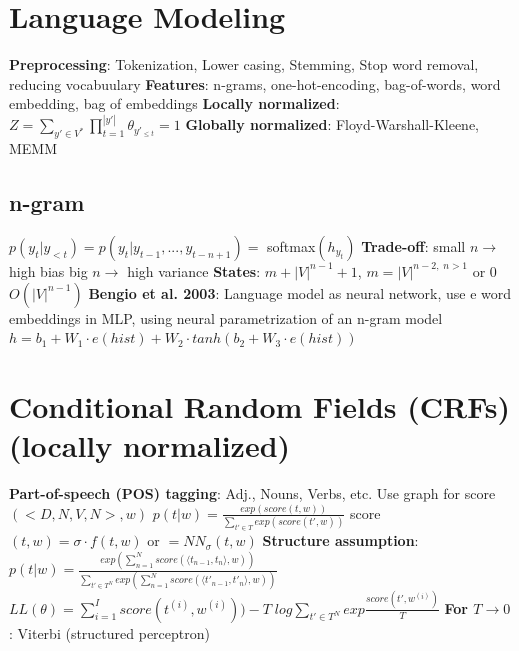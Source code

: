 \documentclass[a4paper, 11pt, landscape]{article}
\begin{document}
\begin{multicols*}{3}
\section{Language Modeling}
\textbf{Preprocessing}: Tokenization, Lower casing, Stemming, Stop word removal, reducing vocabuulary\newline
\textbf{Features}: n-grams, one-hot-encoding, bag-of-words, word embedding, bag of embeddings\newline
\textbf{Locally normalized}: $Z=\sum_{y'\in V^*}\prod_{t=1}^{|y'|}{\theta_{y'_{\le t}}=1}$\newline
\textbf{Globally normalized}: Floyd-Warshall-Kleene, MEMM

\subsection{n-gram}
$p(y_t|y_{<t})=p(y_t|y_{t-1},...,y_{t-n+1})=$ softmax$(h_{y_t})$\newline
\textbf{Trade-off}: small $n \rightarrow$ high bias\qquad
big $n \rightarrow$ high variance\newline
\textbf{States}: $m+|V|^{n-1}+1$, $m=|V|^{n-2,\;n>1}$ or $0$\qquad $O(|V|^{n-1})$\newline
\textbf{Bengio et al. 2003}: Language model as neural network, use e word embeddings in MLP, using neural parametrization of an n-gram model\newline
$h=b_1+W_1\cdot e(hist)+W_2\cdot tanh(b_2+W_3\cdot e(hist))$

\section{Conditional Random Fields (CRFs) (locally normalized)}
\textbf{Part-of-speech (POS) tagging}: Adj., Nouns, Verbs, etc.\newline
Use graph for score$(<D,N,V,N>,w)$\newline
$p(t|w)=\frac{exp(score(t,w))}{\sum_{t'\in T}exp(score(t',w))}$\newline
score$(t,w)=\sigma\cdot f(t,w)$ or $=NN_{\sigma}(t,w)$\newline
\textbf{Structure assumption}: $p(t|w)=\frac{exp(\sum_{n=1}^N score(\langle t_{n-1},t_n \rangle,w))}{\sum_{t'\in T^N} exp(\sum_{n=1}^N score(\langle t'_{n-1},t'_n \rangle,w))}$\newline
$LL(\theta)=\sum_{i=1}^{I}{score(t^{(i)},w^{(i)}))-T\;log\sum_{t'\in T^N}exp\frac{score(t',w^{(i)})}{T}}$\newline
\textbf{For $T\rightarrow 0$}: Viterbi (structured perceptron)


\end{multicols*}
\end{document}
